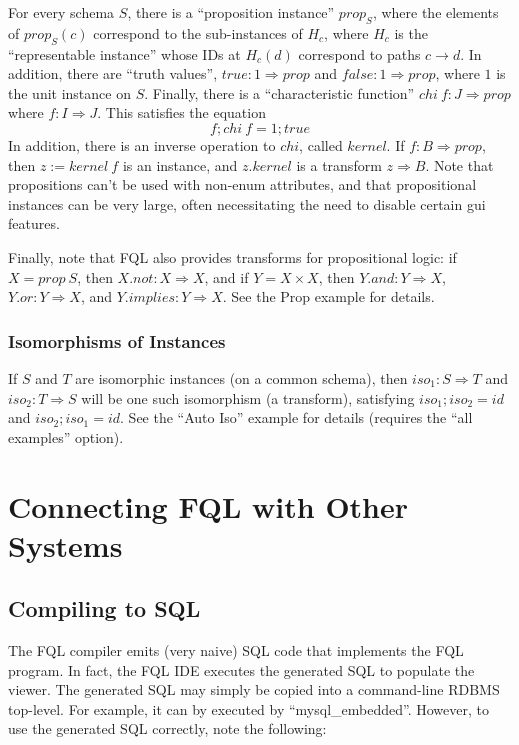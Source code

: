 \documentclass[12pt]{article}
\begin{document}
 For every schema $S$, there is a ``proposition instance'' $prop_S$, where the elements of $prop_S(c)$ correspond to the sub-instances of $H_c$, where $H_c$ is the ``representable instance'' whose IDs at $H_c(d)$ correspond to paths $c \to d$.  In addition, there are ``truth values'', $true : 1 \Rightarrow prop$ and $false : 1 \Rightarrow prop$, where $1$ is the unit instance on $S$.  Finally, there is a ``characteristic function'' $chi \ f : J \Rightarrow prop$ where $f : I \Rightarrow J$.  This satisfies the equation
 $$
 f ; chi \ f = 1 ; true
 $$
 In addition, there is an inverse operation to $chi$, called $kernel$.  If $f : B \Rightarrow prop$, then $z := kernel \ f$ is an instance, and $z.kernel$ is a transform $z \Rightarrow B$.  Note that propositions can't be used with non-enum attributes, and that propositional instances can be very large, often necessitating the need to disable certain gui features.
 
 Finally, note that FQL also provides transforms for propositional logic: if $X = prop \ S$, then $X.not : X \Rightarrow X$, and if $Y = X \times X$, then $Y.and : Y \Rightarrow X$, $Y.or : Y \Rightarrow X$, and $Y.implies : Y \Rightarrow X$.  See the Prop example for details. 
 
 \subsubsection{Isomorphisms of Instances}
 If $S$ and $T$ are isomorphic instances (on a common schema), then $iso_1 : S \Rightarrow T$ and $iso_2 : T \Rightarrow S$ will be one such isomorphism (a transform), satisfying $iso_1 ; iso_2 = id$ and $iso_2 ; iso_1 = id$.   See the ``Auto Iso'' example for details (requires the ``all examples'' option). 

 
 \section{Connecting FQL with Other Systems}

\subsection{Compiling to SQL}

The FQL compiler emits (very naive) SQL code that implements the FQL program.  In fact, the FQL IDE executes the generated SQL to populate the viewer.  The generated SQL may simply be copied into a command-line RDBMS top-level.  For example, it can by executed by ``mysql\_embedded''.  However, to use the generated SQL correctly, note the following:
\end{document}
